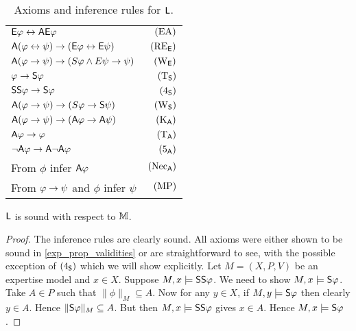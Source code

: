 \begin{table}
    \centering
    \caption{Axioms and inference rules for $\sL$.}
    \begin{tabular}{lr}
        \toprule
         $\E\phi \liff \A\E\phi$
             & $\EA$ \\
         $\A(\phi \liff \psi) \limplies (\E\phi \liff \E\psi)$
             & $\reE$ \\
         $\A(\phi \limplies \psi) \limplies (S\phi \land E\psi \limplies \psi)$
             & $\weakeningE$ \\
         \midrule
         $\phi \limplies \S\phi$
             & $\Tsoundness$ \\
         $\S\S\phi \limplies \S\phi$
             & $\foursoundness$ \\
         $\A(\phi \limplies \psi) \limplies (S\phi \limplies \S\psi)$
             & $\weakeningS$ \\
         \midrule
         $\A(\phi \limplies \psi) \limplies (\A\phi \limplies \A\psi)$
             & $\Kuniv$ \\
         $\A\phi \limplies \phi$
             & $\Tuniv$ \\
         $\neg\A\phi \limplies \A\neg\A\phi$
             & $\fiveuniv$ \\
         \midrule
         From $\phi$ infer $\A\phi$
             & $\necuniv$ \\
         From $\phi \limplies \psi$ and $\phi$ infer $\psi$
             & $\modpon$ \\
        \bottomrule
    \end{tabular}
    \label{exp_tab_axioms_general_case}
\end{table}

\begin{lemma}
\label{exp_lemma_soundness_m}
    $\sL$ is sound with respect to $\M$.
\end{lemma}

\begin{proof}
    The inference rules are clearly sound. All axioms were either shown to be
    sound in \cref{exp_prop_validities} or are straightforward to see, with the
    possible exception of $\foursoundness$ which we will show explicitly. Let
    $M = (X, P, V)$ be an expertise model and $x \in X$. Suppose $M, x \models
    \S\S\phi$. We need to show $M, x \models \S\phi$. Take $A \in P$ such that
    $\|\phi\|_M \subseteq A$. Now for any $y \in X$, if $M, y \models \S\phi$
    then clearly $y \in A$. Hence $\|\S\phi\|_M \subseteq A$. But then $M, x
    \models \S\S\phi$ gives $x \in A$. Hence $M, x \models \S\phi$.
\end{proof}


